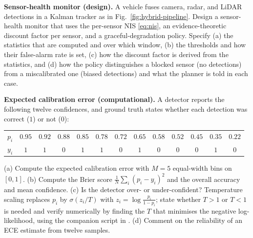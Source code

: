 \problemsection

\begin{prob}\label{prob:ch08:1}
\textbf{Sensor-health monitor (design).} A vehicle fuses camera, radar, and LiDAR detections in a Kalman tracker as in Fig.~\ref{fig:hybrid-pipeline}. Design a sensor-health monitor that uses the per-sensor NIS \eqref{eq:nis}, an evidence-theoretic discount factor per sensor, and a graceful-degradation policy. Specify (a) the statistics that are computed and over which window, (b) the thresholds and how their false-alarm rate is set, (c) how the discount factor is derived from the statistics, and (d) how the policy distinguishes a blocked sensor (no detections) from a miscalibrated one (biased detections) and what the planner is told in each case.
\end{prob}

\begin{prob}\label{prob:ch08:2}
\textbf{Expected calibration error (computational).} A detector reports the following twelve confidences, and ground truth states whether each detection was correct ($1$) or not ($0$):
\begin{center}\scriptsize
\setlength{\tabcolsep}{3.5pt}
\begin{tabular}{l*{12}{c}}
\toprule
$p_i$ & $0.95$ & $0.92$ & $0.88$ & $0.85$ & $0.78$ & $0.72$ & $0.65$ & $0.58$ & $0.52$ & $0.45$ & $0.35$ & $0.22$ \\
$y_i$ & $1$ & $1$ & $0$ & $1$ & $1$ & $0$ & $1$ & $0$ & $0$ & $0$ & $1$ & $0$ \\
\bottomrule
\end{tabular}
\end{center}
(a) Compute the expected calibration error with $M=5$ equal-width bins on $[0,1]$. (b) Compute the Brier score $\frac{1}{N}\sum_i(p_i-y_i)^2$ and the overall accuracy and mean confidence. (c) Is the detector over- or under-confident? Temperature scaling replaces $p_i$ by $\sigma(z_i/T)$ with $z_i=\log\frac{p_i}{1-p_i}$; state whether $T>1$ or $T<1$ is needed and verify numerically by finding the $T$ that minimises the negative log-likelihood, using the companion script  in . (d) Comment on the reliability of an ECE estimate from twelve samples.
\end{prob}

